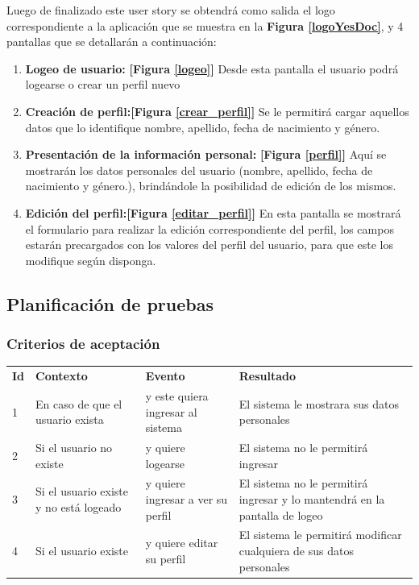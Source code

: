 Luego de finalizado este user story se obtendrá como salida el logo correspondiente a la aplicación que se muestra en la \textbf{Figura \ref{logoYesDoc}}, y 4 pantallas que se detallarán a continuación:
\begin{enumerate}
	\item \textbf{Logeo de usuario:} \textbf{[Figura \ref{logeo}]} Desde esta pantalla el usuario podrá logearse  o crear un perfil nuevo
	\item \textbf{Creación de perfil:}\textbf{[Figura \ref{crear_perfil}]} Se le permitirá cargar aquellos datos que lo identifique nombre, apellido, fecha de nacimiento y género.
    \item \textbf{Presentación de la información personal:} \textbf{[Figura \ref{perfil}]} Aquí se mostrarán los datos personales del usuario (nombre, apellido, fecha de nacimiento y género.), brindándole la posibilidad de edición de los mismos.
    \item \textbf{Edición del perfil:}\textbf{[Figura \ref{editar_perfil}]} En esta pantalla se mostrará el formulario para realizar la edición correspondiente del perfil, los campos estarán precargados con los valores del perfil del usuario, para que este los modifique según disponga.
\end{enumerate}



\clearpage	
\subsection{Planificación de pruebas}
\subsubsection{Criterios de aceptación}


\begin{center}
\begin{longtable}{|p{0.5cm}|p{4cm}|p{4cm}|p{5cm}|}
\hline \rowcolor[gray]{0.9}
	\multicolumn{4}{||c|}{\textbf{Criterio de aceptación}} \\
    \hline  \rowcolor[gray]{0.9}
        \textbf{Id} &
        \textbf{Contexto} &
        \textbf{Evento}&
        \textbf{Resultado} \\
    \hline
        1&En caso de que el usuario exista & y este quiera ingresar al sistema & El sistema le mostrara sus datos personales\\ \hline
        2 &       Si el usuario no existe & y quiere logearse & El sistema no le permitirá ingresar\\ \hline
        3 &       Si el usuario existe y no está logeado & y quiere ingresar a ver su perfil& El sistema no le permitirá ingresar y lo mantendrá en la pantalla de logeo\\ \hline
        4 &       Si el usuario existe & y quiere editar su perfil & El sistema le permitirá modificar cualquiera de sus datos personales\\ \hline
  \end{longtable}
\end{center}


